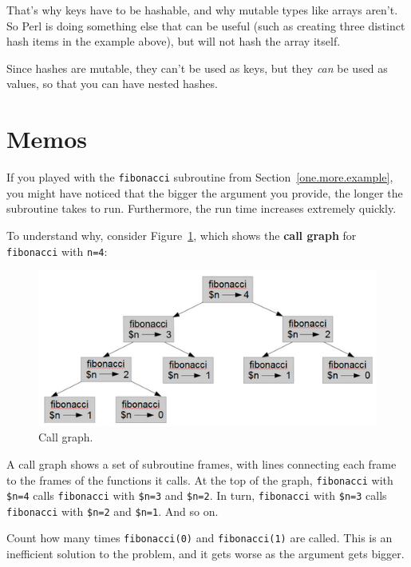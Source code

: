 That's why keys have to be hashable, and why mutable types like
arrays aren't. So Perl is doing something else that can be 
useful (such as creating three distinct hash items in the 
example above), but will not hash the array itself.

Since hashes are mutable, they can't be used as keys,
but they {\em can} be used as values, so that you can 
have nested hashes.

\section{Memos}
\label{memoize}

If you played with the {\tt fibonacci} subroutine from
Section~\ref{one.more.example}, you might have noticed that 
the bigger the argument you provide, the longer the 
subroutine takes to run. Furthermore, the run time 
increases extremely quickly.

To understand why, consider Figure~\ref{fig.fibonacci}, which shows
the {\bf call graph} for {\tt fibonacci} with {\tt n=4}:

\begin{figure}
\centerline
{\includegraphics[scale=0.7]{figs/fibonacci.png}}
\caption{Call graph.}
\label{fig.fibonacci}
\end{figure}

A call graph shows a set of subroutine frames, with lines 
connecting each frame to the frames of the functions it 
calls.  At the top of the graph, {\tt fibonacci} with 
\verb'$n=4' calls {\tt fibonacci} with \verb'$n=3' and 
\verb'$n=2'.  In turn, {\tt fibonacci} with \verb'$n=3' calls
{\tt fibonacci} with \verb'$n=2' and \verb'$n=1'.  And so on.

Count how many times {\tt fibonacci(0)} and {\tt fibonacci(1)} 
are called.  This is an inefficient solution to the problem, 
and it gets worse as the argument gets bigger.

